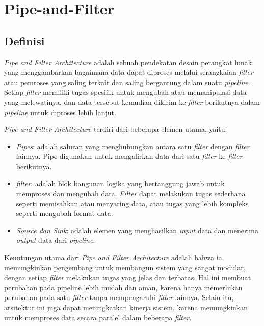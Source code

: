 \chapter{Pipe-and-Filter}



	\section{Definisi}
		\textit{Pipe and Filter Architecture} adalah sebuah pendekatan desain perangkat lunak yang menggambarkan bagaimana data dapat diproses melalui serangkaian \textit{filter} atau pemroses yang saling terkait dan saling bergantung dalam suatu \textit{pipeline}. Setiap \textit{filter} memiliki tugas spesifik untuk mengubah atau memanipulasi data yang melewatinya, dan data tersebut kemudian dikirim ke \textit{filter} berikutnya dalam \textit{pipeline} untuk diproses lebih lanjut.
	
	\textit{Pipe and Filter Architecture} terdiri dari beberapa elemen utama, yaitu:
	\begin{itemize}
		\item \textit{Pipes}: adalah saluran yang menghubungkan antara satu \textit{filter} dengan \textit{filter} lainnya. Pipe digunakan untuk mengalirkan data dari satu \textit{filter} ke \textit{filter} berikutnya.
		\item \textit{filter}: adalah blok bangunan logika yang bertanggung jawab untuk memproses dan mengubah data. \textit{Filter} dapat melakukan tugas sederhana seperti memisahkan atau menyaring data, atau tugas yang lebih kompleks seperti mengubah format data.
		\item \textit{Source dan Sink}: adalah elemen yang menghasilkan \textit{input} data dan menerima \textit{output} data dari \textit{pipeline}.
	\end{itemize}
	
	Keuntungan utama dari \textit{Pipe and Filter Architecture} adalah bahwa ia memungkinkan pengembang untuk membangun sistem yang sangat modular, dengan setiap \textit{filter} melakukan tugas yang jelas dan terbatas. Hal ini membuat perubahan pada pipeline lebih mudah dan aman, karena hanya memerlukan perubahan pada satu \textit{filter} tanpa mempengaruhi \textit{filter} lainnya. Selain itu, arsitektur ini juga dapat meningkatkan kinerja sistem, karena memungkinkan untuk memproses data secara paralel dalam beberapa \textit{filter}.
	
